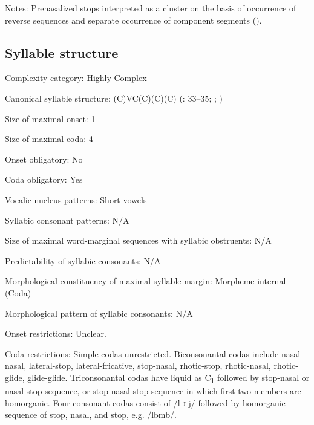 {\begin{appendixdesc}
\item[Notes:] Prenasalized stops interpreted as a cluster on the basis of occurrence of reverse sequences and separate occurrence of component segments (\citeyear[34]{Sommer1969}).
\end{appendixdesc}
\subsection*{Syllable structure}
\begin{appendixdesc}

\item[Complexity category:] Highly Complex

\item[Canonical syllable structure:] (C)VC(C)(C)(C) (\citealt{Sommer1969}: 33--35; \citealt{Sommer1981}; \citealt{Dixon1970})

\item[Size of maximal onset:] 1

\item[Size of maximal coda:] 4

\item[Onset obligatory:] No

\item[Coda obligatory:] Yes

\item[Vocalic nucleus patterns:] Short vowels

\item[Syllabic consonant patterns:] N/A

\item[Size of maximal word-marginal sequences with syllabic obstruents:] N/A

\item[Predictability of syllabic consonants:] N/A

\item[Morphological constituency of maximal syllable margin:] Morpheme-internal (Coda)

\item[Morphological pattern of syllabic consonants:] N/A

\item[Onset restrictions:] Unclear.

\item[Coda restrictions:] Simple codas unrestricted. Biconsonantal codas include nasal-nasal, lateral-stop, lateral-fricative, stop-nasal, rhotic-stop, rhotic-nasal, rhotic-glide, glide-glide. Triconsonantal codas have liquid as C\textsubscript{1} followed by stop-nasal or nasal-stop sequence, or stop-nasal-stop sequence in which first two members are homorganic. Four-consonant codas consist of /l ɹ j/ followed by homorganic sequence of stop, nasal, and stop, e.g. /lbmb/.


\end{appendixdesc}}
